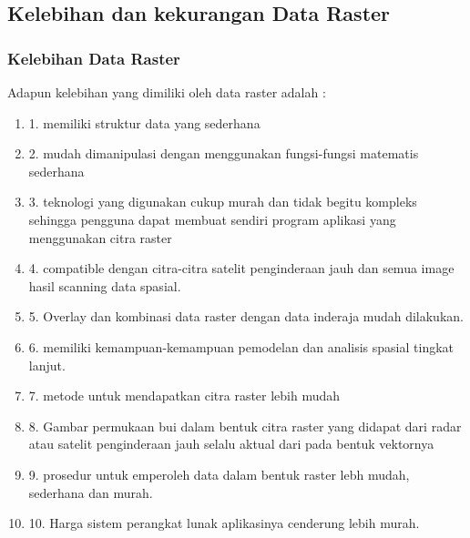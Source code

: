 \subsection{Kelebihan dan kekurangan Data Raster}
\subsubsection{Kelebihan Data Raster}
Adapun kelebihan yang dimiliki oleh data raster adalah :
	\begin{enumerate}
		\item 1. memiliki struktur data yang sederhana
		\item 2. mudah dimanipulasi dengan menggunakan fungsi-fungsi matematis sederhana
		\item 3. teknologi yang digunakan cukup murah dan tidak begitu kompleks sehingga pengguna dapat membuat sendiri program aplikasi yang menggunakan citra raster
		\item 4. compatible dengan citra-citra satelit penginderaan jauh dan semua image hasil scanning data spasial.
		\item 5. Overlay dan kombinasi data raster dengan data inderaja mudah dilakukan.
		\item 6. memiliki kemampuan-kemampuan pemodelan dan analisis  spasial tingkat lanjut.
		\item 7. metode untuk mendapatkan citra raster lebih mudah
		\item 8. Gambar permukaan bui dalam bentuk citra raster yang didapat dari radar atau satelit penginderaan jauh selalu aktual dari pada bentuk vektornya
		\item 9. prosedur untuk emperoleh data dalam bentuk raster lebh mudah, sederhana dan murah.
		\item 10. Harga sistem perangkat lunak aplikasinya cenderung lebih murah.
	\end{enumerate}\cite{irwansyah2013sistem}

